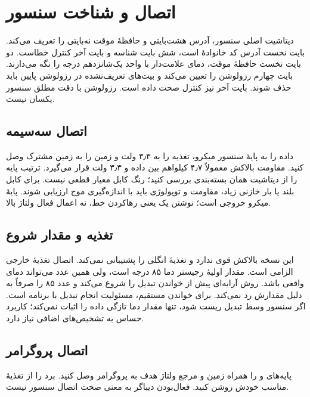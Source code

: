 \section{اتصال و شناخت سنسور}
دیتاشیت اصلی سنسور، آدرس هشت‌بایتی و حافظهٔ موقت نه‌بایتی را تعریف می‌کند.
\cite{ds18b20}
بایت نخست آدرس کد خانوادهٔ
است، شش بایت شناسه و بایت آخر کنترل خطاست. دو بایت نخست حافظهٔ موقت، دمای
علامت‌دار با واحد یک‌شانزدهم درجه را نگه می‌دارند. بایت چهارم رزولوشن را تعیین
می‌کند و بیت‌های تعریف‌نشده در رزولوشن پایین باید حذف شوند. بایت آخر نیز
کنترل صحت داده است. رزولوشن با دقت مطلق سنسور یکسان نیست.

\subsection{اتصال سه‌سیمه}
داده را به پایهٔ سنسور میکرو، تغذیه را به ۳٫۳ ولت و زمین را به زمین مشترک
وصل کنید. مقاومت بالاکش معمولاً ۴٫۷ کیلو‌اهم بین داده و ۳٫۳ ولت قرار می‌گیرد.
ترتیب پایه را از دیتاشیت همان بسته‌بندی بررسی کنید؛ رنگ کابل معیار قطعی نیست.
برای کابل بلند یا بار خازنی زیاد، مقاومت و توپولوژی باید با اندازه‌گیری موج
ارزیابی شوند. پایهٔ میکرو خروجی
است؛ نوشتن یک یعنی رهاکردن خط، نه اعمال فعال ولتاژ بالا.

\subsection{تغذیه و مقدار شروع}
این نسخه بالاکش قوی ندارد و تغذیهٔ انگلی را پشتیبانی نمی‌کند. اتصال تغذیهٔ
خارجی الزامی است. مقدار اولیهٔ رجیستر دما ۸۵ درجه است، ولی همین عدد می‌تواند
دمای واقعی باشد. روش آرایه‌ای پیش از خواندن تبدیل را شروع می‌کند و عدد ۸۵
را صرفاً به دلیل مقدارش رد نمی‌کند. برای خواندن مستقیم، مسئولیت انجام تبدیل
با برنامه است. اگر سنسور وسط تبدیل ریست شود، تنها مقدار دما تازگی داده را
اثبات نمی‌کند؛ کاربرد حساس به تشخیص‌های اضافی نیاز دارد.

\subsection{اتصال پروگرامر}
پایه‌های
و
را همراه زمین و مرجع ولتاژ هدف به پروگرامر وصل کنید. برد را از تغذیهٔ مناسب
خودش روشن کنید. فعال‌بودن دیباگر به معنی صحت اتصال سنسور نیست.
